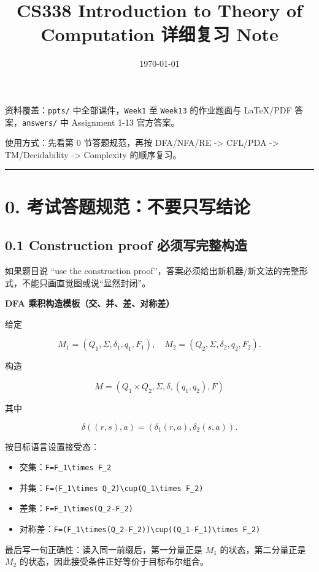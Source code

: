 ﻿\documentclass[UTF8,11pt]{ctexart}
\title{CS338 Introduction to Theory of Computation 详细复习 Note}
\author{}
\date{\today}
\begin{document}
\maketitle
\tableofcontents
\newpage


资料覆盖：\texttt{ppts/} 中全部课件，\texttt{Week1} 至 \texttt{Week13} 的作业题面与 LaTeX/PDF 答案，\texttt{answers/} 中 Assignment 1-13 官方答案。  

使用方式：先看第 0 节答题规范，再按 DFA/NFA/RE -> CFL/PDA -> TM/Decidability -> Complexity 的顺序复习。


\bigskip\hrule\bigskip


\section{0. 考试答题规范：不要只写结论}


\subsection{0.1 Construction proof 必须写完整构造}


如果题目说 “use the construction proof”，答案必须给出新机器/新文法的完整形式，不能只画直觉图或说“显然封闭”。


\textbf{DFA 乘积构造模板（交、并、差、对称差）}


给定

\[
M_1=(Q_1,\Sigma,\delta_1,q_1,F_1),\quad
M_2=(Q_2,\Sigma,\delta_2,q_2,F_2).
\]

构造

\[
M=(Q_1\times Q_2,\Sigma,\delta,(q_1,q_2),F)
\]

其中

\[
\delta((r,s),a)=(\delta_1(r,a),\delta_2(s,a)).
\]

按目标语言设置接受态：


\begin{itemize}
\item 交集：\texttt{F=F\_1\textbackslash{}times F\_2}
\item 并集：\texttt{F=(F\_1\textbackslash{}times Q\_2)\textbackslash{}cup(Q\_1\textbackslash{}times F\_2)}
\item 差集：\texttt{F=F\_1\textbackslash{}times(Q\_2-F\_2)}
\item 对称差：\texttt{F=(F\_1\textbackslash{}times(Q\_2-F\_2))\textbackslash{}cup((Q\_1-F\_1)\textbackslash{}times F\_2)}
\end{itemize}


最后写一句正确性：读入同一前缀后，第一分量正是 \(M_1\) 的状态，第二分量正是 \(M_2\) 的状态，因此接受条件正好等价于目标布尔组合。
\end{document}
